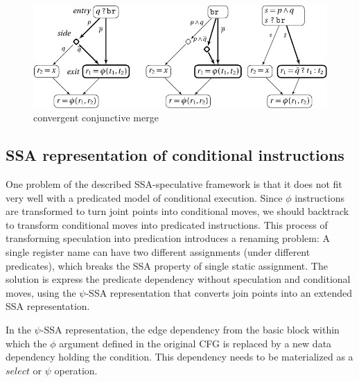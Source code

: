 \begin{figure}[h]
  \includegraphics[scale=0.9]{phi_merge}
  \caption{\label{fig:phi_merge}convergent conjunctive merge} 
\end{figure}

\subsection{SSA representation of conditional instructions}

One problem of the described SSA-speculative framework is that it does not fit very well with a predicated model of conditional execution. Since $\phi$ instructions are transformed to turn joint points into conditional moves, we should backtrack to transform conditional moves into predicated instructions. This process of transforming speculation into predication introduces a renaming problem: A single register name can have two different assignments (under different predicates), which breaks the SSA property of single static assignment. The solution is express the predicate dependency without speculation and conditional moves, using the $\psi$-SSA representation that converts join points into an extended SSA representation.

In the $\psi$-SSA representation, the edge dependency from the basic block within which the $\phi$ argument defined in the original CFG is replaced by a new data dependency holding the condition. This dependency needs to be materialized as a $select$ or $\psi$ operation.

